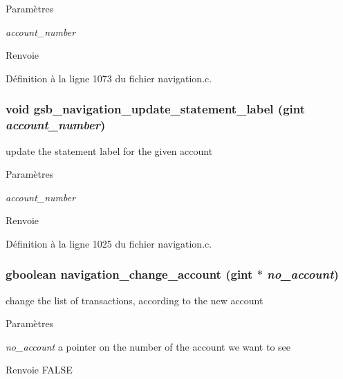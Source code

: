 \begin{DoxyParams}{Paramètres}
\item[{\em account\_\-number}]\end{DoxyParams}
\begin{DoxyReturn}{Renvoie}

\end{DoxyReturn}


Définition à la ligne 1073 du fichier navigation.c.

\subsubsection[{gsb\_\-navigation\_\-update\_\-statement\_\-label}]{\setlength{\rightskip}{0pt plus 5cm}void gsb\_\-navigation\_\-update\_\-statement\_\-label (gint {\em account\_\-number})}\label{navigation_8c_a342b7c00db1370b25971fbc56df7b02e}
update the statement label for the given account


\begin{DoxyParams}{Paramètres}
\item[{\em account\_\-number}]\end{DoxyParams}
\begin{DoxyReturn}{Renvoie}

\end{DoxyReturn}


Définition à la ligne 1025 du fichier navigation.c.

\subsubsection[{navigation\_\-change\_\-account}]{\setlength{\rightskip}{0pt plus 5cm}gboolean navigation\_\-change\_\-account (gint $\ast$ {\em no\_\-account})}\label{navigation_8c_a610fc35ca64e7ce4e22dd7e8cb59549f}
change the list of transactions, according to the new account


\begin{DoxyParams}{Paramètres}
\item[{\em no\_\-account}]a pointer on the number of the account we want to see\end{DoxyParams}
\begin{DoxyReturn}{Renvoie}
FALSE 
\end{DoxyReturn}


